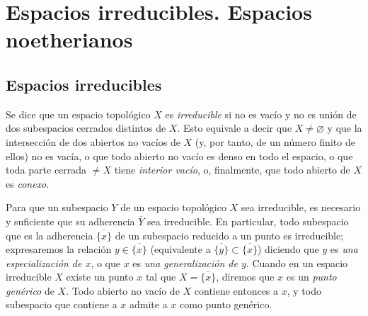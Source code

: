 
\section{Espacios irreducibles. Espacios noetherianos}
\label{section:0.2-fr}

\subsection{Espacios irreducibles}
\label{subsection:0.2.1-fr}

\begin{env}[2.1.1]
\label{0.2.1.1-fr}
Se dice que un espacio topológico $X$ es \emph{irreducible} si no es vacío
y no es unión de dos subespacios cerrados distintos de $X$. Esto
equivale a decir que $X\neq\varnothing$ y que la intersección de dos
abiertos no vacíos de $X$ (y, por tanto, de un número finito de ellos) no es
vacía, o que todo abierto no vacío es denso en todo el espacio, o que toda parte
cerrada $\neq X$ tiene \emph{interior vacío}, o, finalmente, que todo abierto de $X$ es
\emph{conexo}.
\end{env}

\begin{env}[2.1.2]
\label{0.2.1.2-fr}
Para que un subespacio $Y$ de un espacio topológico $X$ sea irreducible, es
necesario y suficiente que su adherencia $\overline Y$ sea irreducible. En
particular, todo subespacio que es la adherencia $\overline{\{x\}}$ de un
subespacio reducido a un punto es irreducible; expresaremos la relación
$y\in\overline{\{x\}}$ (equivalente a
$\overline{\{y\}}\subset\overline{\{x\}}$) diciendo que $y$ es
\emph{una especialización de $x$}, o que $x$ es \emph{una generalización de $y$}.
Cuando en un espacio irreducible $X$ existe un punto $x$ tal que
$X=\overline{\{x\}}$, diremos que $x$ es un \emph{punto genérico} de $X$.
Todo abierto no vacío de $X$ contiene entonces a $x$, y todo subespacio que contiene
a $x$ admite a $x$ como punto genérico.
\end{env}

